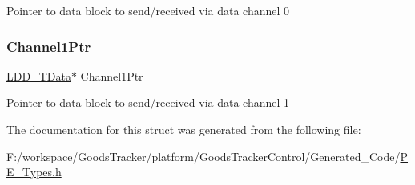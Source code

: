 Pointer to data block to send/received via data channel 0 \mbox{\label{struct_l_d_d___s_s_i___t_data_blocks_ac3d326ecc3091d02f4b70e0d09a25c3e}} 
\subsubsection{\texorpdfstring{Channel1\+Ptr}{Channel1Ptr}}
{\footnotesize\ttfamily \hyperlink{group___p_e___types__module_gade8ef9401405bd941b6da738b807f980}{L\+D\+D\+\_\+\+T\+Data}$\ast$ Channel1\+Ptr}

Pointer to data block to send/received via data channel 1 

The documentation for this struct was generated from the following file\+:\begin{DoxyCompactItemize}
\item 
F\+:/workspace/\+Goods\+Tracker/platform/\+Goods\+Tracker\+Control/\+Generated\+\_\+\+Code/\hyperlink{_p_e___types_8h}{P\+E\+\_\+\+Types.\+h}\end{DoxyCompactItemize}
